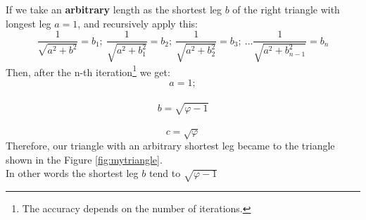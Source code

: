 \documentclass[12pt, letterpaper, oneside]{report}
\begin{document}
If we take an \textbf{arbitrary} length as the shortest leg $b$ of the right triangle with longest leg $a=1$, and recursively apply this:
\begin{equation}
\dfrac{1}{\sqrt{a^2+b^2}} = b_{1}; \   \dfrac{1}{\sqrt{a^2+b_{1}^2}} = b_{2}; \   \dfrac{1}{\sqrt{a^2+b_{2}^2}}=b_{3}; \ ... \dfrac{1}{\sqrt{a^2+b_{n-1}^2}}=b_{n}
\end{equation} 
Then, after the n-th iteration\footnote{The accuracy depends on the number of iterations.} we get:
\begin{equation}
a=1;
\end{equation}
\\
\begin{equation}
b=\sqrt{\varphi-1}
\end{equation}
\\
\begin{equation}
c=\sqrt{\varphi}
\end{equation}
Therefore, our triangle with an arbitrary shortest leg became to the triangle shown in the Figure \ref{fig:mytriangle}.
\\
In other words the shortest leg $b$ tend to $\sqrt{\varphi-1}$
\\

 
\newpage
\end{document}
